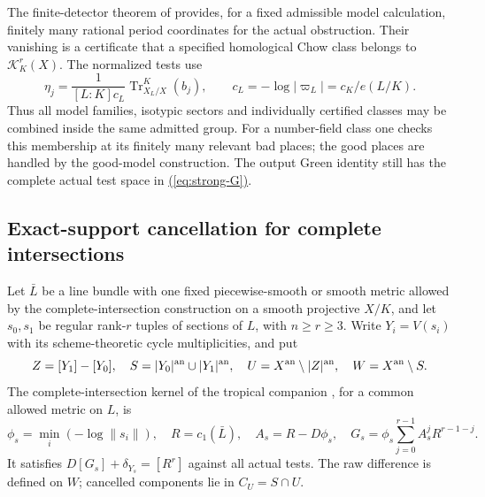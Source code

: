 \documentclass[11pt,a4paper]{article}
\theoremstyle{definition}
\theoremstyle{remark}\newtheorem{remark}[theorem]{Remark}
\numberwithin{equation}{section}
\newcommand{\Tr}{\operatorname{Tr}}\newcommand{\ch}{\operatorname{ch}}
\newcommand{\cK}{\mathcal K}\newcommand{\cH}{\mathcal H}
\renewcommand{\eqref}[1]{\hyperref[#1]{\textcolor{equationlink}{(\ref*{#1})}}}
\begin{document}
The finite-detector theorem of \cite{InternalDetectors} provides,
for a fixed admissible model calculation, finitely many rational
period coordinates for the actual obstruction. Their vanishing
is a certificate that a specified homological Chow class belongs
to $\cK_K^r(X)$. The normalized tests use
\[
 \eta_j=\frac{1}{[L:K]c_L}\Tr^K_{X_L/X}(b_j),\qquad
 c_L=-\log|\varpi_L|=c_K/e(L/K).
\]
Thus all model families, isotypic sectors and individually certified
classes may be combined inside the same admitted group. For a
number-field class one checks this membership at its finitely many
relevant bad places; the good places are handled by the good-model
construction. The output Green identity still has the complete
actual test space in \eqref{eq:strong-G}.

\subsection{Exact-support cancellation for complete intersections}\label{sub:ci-certificates}

Let $\bar L$ be a line bundle with one fixed piecewise-smooth or
smooth metric allowed by the complete-intersection construction
on a smooth projective $X/K$, and let
$s_0,s_1$ be regular rank-$r$ tuples of sections of $L$, with
$n\geq r\geq3$. Write $Y_i=V(s_i)$ with its scheme-theoretic
cycle multiplicities, and put
\[
 Z=[Y_1]-[Y_0],\quad
 S=|Y_0|^{\mathrm{an}}\cup|Y_1|^{\mathrm{an}},\quad
 U=X^{\mathrm{an}}\setminus|Z|^{\mathrm{an}},\quad W=X^{\mathrm{an}}\setminus S.
\]
The complete-intersection kernel of the tropical companion
\cite{InternalTropical}, for a common allowed metric on $L$, is
\begin{equation}\label{eq:ci-kernel}
 \phi_s=\min_i(-\log\|s_i\|),\quad
 R=c_1(\bar L),\quad A_s=R-D\phi_s,\quad
 G_s=\phi_s\sum_{j=0}^{r-1}A_s^jR^{r-1-j}.
\end{equation}
It satisfies $D[G_s]+\delta_{Y_s}=[R^r]$ against all actual
tests. The raw difference is defined on $W$; cancelled components
lie in $C_U=S\cap U$.
\end{document}
